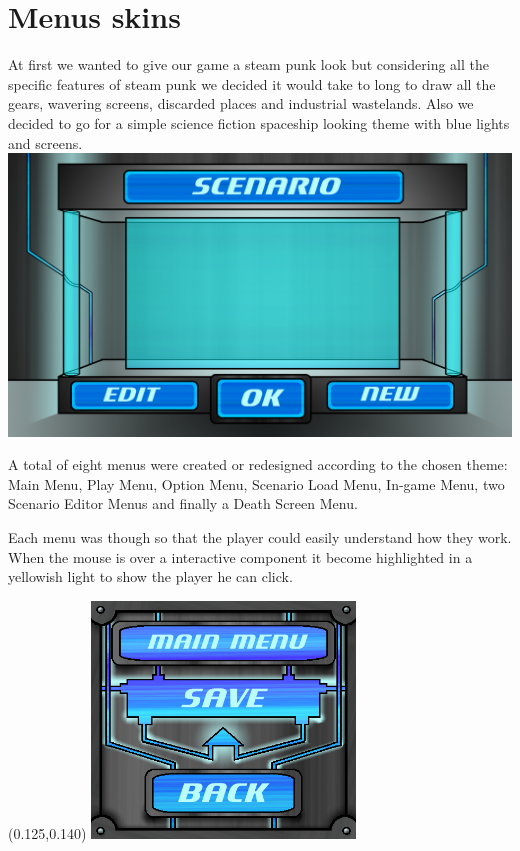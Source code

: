 \documentclass[article]{report}         %
\begin{document}
            \section{Menus skins}

At first we wanted to give our game a steam punk look but considering all the specific features of steam punk we decided it would take to long to draw all the gears, wavering screens, discarded places and industrial wastelands. Also we decided to go for a simple science fiction spaceship looking theme with blue lights and screens. \\

\includegraphics[width=15cm]{images/Skins/Load_Scenario_normal.png}

A total of eight menus were created or redesigned according to the chosen theme: Main Menu, Play Menu, Option Menu, Scenario Load Menu, In-game Menu, two Scenario Editor Menus and finally a Death Screen Menu. \\

\newpage

Each menu was though so that the player could easily understand how they work. When the mouse is over a interactive component it become highlighted in a yellowish light to show the player he can click. \\

\begin{textblock}{0.5}(0.125,0.140)
\includegraphics[width=7cm]{images/Skins/ingame_menu_normal.png}
\end{textblock}
\end{document}
